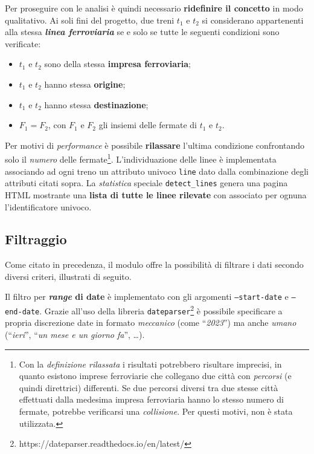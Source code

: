 \documentclass[12pt,italian]{report}
\begin{document}
Per proseguire con le analisi è quindi necessario \textbf{ridefinire
    il concetto} in modo qualitativo.  Ai soli fini del progetto, due
treni $t_1$ e $t_2$ si considerano appartenenti alla stessa
\textbf{\textit{linea ferroviaria}} se e solo se tutte le seguenti
condizioni sono verificate:
\begin{itemize}
    \item $t_1$ e $t_2$ sono della stessa \textbf{impresa
        ferroviaria};
    \item $t_1$ e $t_2$ hanno stessa \textbf{origine};
    \item $t_1$ e $t_2$ hanno stessa \textbf{destinazione};
    \item $F_1 = F_2$, con $F_1$ e $F_2$ gli insiemi delle fermate di
    $t_1$ e $t_2$.
\end{itemize}

Per motivi di \textit{performance} è possibile \textbf{rilassare}
l'ultima condizione confrontando solo il \textit{numero} delle
fermate\footnote{Con la \textit{definizione rilassata} i risultati
    potrebbero risultare imprecisi, in quanto esistono imprese
    ferroviarie che collegano due città con \textit{percorsi} (e
    quindi direttrici) differenti.  Se due percorsi diversi tra due
    stesse città effettuati dalla medesima impresa ferroviaria hanno
    lo stesso numero di fermate, potrebbe verificarsi una
    \textit{collisione}. Per questi motivi, non è stata utilizzata.}.
L'individuazione delle linee è implementata associando ad ogni treno
un attributo univoco \texttt{line} dato dalla combinazione degli
attributi citati sopra.  La \textit{statistica} speciale
\texttt{detect\-\_lines} genera una pagina HTML mostrante una
\textbf{lista di tutte le linee rilevate} con associato per ognuna
l'identificatore univoco.

\subsection{Filtraggio}

Come citato in precedenza, il modulo offre la possibilità di filtrare
i dati secondo diversi criteri, illustrati di seguito.

Il filtro per \textbf{\textit{range} di date} è implementato con gli
argomenti \texttt{--start\--date} e \texttt{--end\--date}.  Grazie
all'uso della libreria
\texttt{dateparser}\footnote{https://dateparser.readthedocs.io/en/latest/}
è possibile specificare a propria discrezione date in formato
\textit{meccanico} (come ``\textit{2023}'') ma anche
\textit{umano} (``\textit{ieri}'', ``\textit{un mese e un giorno
    fa}'', \dots).
\end{document}
